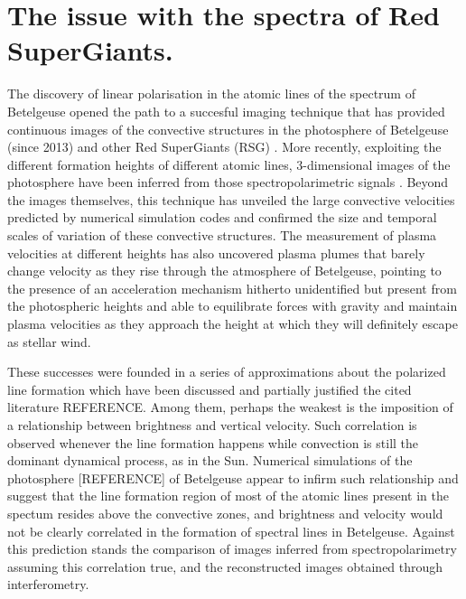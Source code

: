 \documentclass{/Users/art2/TeX/aanda/aa}
\begin{document}
\section{The issue with the spectra of Red SuperGiants.}
The discovery of linear polarisation in the atomic lines of the spectrum of Betelgeuse \citep{auriere_discovery_2016}  opened the path to a succesful imaging technique 
that has provided continuous images of the convective structures in the photosphere of Betelgeuse (since 2013) and other Red SuperGiants (RSG) \citep{lopez_ariste_convective_2018}. More recently, exploiting 
the different formation heights of different atomic lines, 3-dimensional images of the photosphere have been inferred from those spectropolarimetric 
signals \citep{lopez_ariste_three-dimensional_2022}. Beyond the images themselves, this technique has unveiled the large convective velocities predicted by numerical simulation codes and confirmed 
the size and temporal scales of variation of these convective structures. The measurement of plasma velocities at different heights has also uncovered 
plasma plumes that barely change velocity as they rise through the atmosphere of Betelgeuse, pointing to the presence of an acceleration mechanism 
hitherto unidentified but present from the photospheric heights and able to equilibrate forces with gravity and maintain plasma velocities as 
they approach the height at which they will definitely escape as stellar wind.

These successes were founded in a series of approximations about the polarized line formation which have been discussed and partially justified  the cited literature {REFERENCE}. Among them, perhaps the weakest is the imposition of a relationship between brightness and vertical velocity. Such correlation 
is observed whenever the line formation happens while convection is still the dominant dynamical process, as in the Sun. Numerical simulations of the 
photosphere [REFERENCE] of Betelgeuse appear to infirm such relationship and suggest that the line formation region of most of the atomic lines present in 
the spectum resides above the convective zones, and brightness 
and velocity would not be clearly correlated in the formation of spectral lines in Betelgeuse. Against this prediction stands the comparison of 
images inferred from spectropolarimetry assuming this correlation true, and the reconstructed images obtained through interferometry. 
\end{document}
